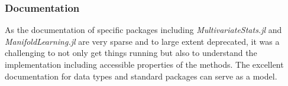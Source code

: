 \documentclass[journal, a4paper]{IEEEtran}
\begin{document}
\subsubsection{Documentation}
As the documentation of specific packages including \textit{MultivariateStats.jl} and \textit{ManifoldLearning.jl} are very sparse and to large extent deprecated, it was a challenging to not only get things running but also to understand the implementation including accessible properties of the methods. The excellent documentation for data types and standard packages can serve as a model. \\


\end{document}
